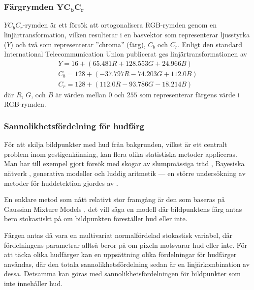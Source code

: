 \documentclass[../rapport_MVEX01-11-05]{subfiles}
\begin{document}
\subsubsection[Färgrymden $\mathrm{YC_bC_r}$]{Färgrymden $\mathbf{YC_bC_r}$}

$YC_bC_r$-rymden är ett försök att ortogonalisera RGB-rymden genom en
linjärtransformation, vilken resulterar i en basvektor som
representerar ljusstyrka ($Y$) och två som representerar ''chroma''
(färg), $C_b$ och $C_r$. Enligt den standard International
Telecommunication Union publicerat \cite{ITU-BT601} ges
linjärtransformationen av
\begin{equation*}
  \label{eq:farg:ycbcr}
  \begin{gathered}
  Y   = 16  + ( 65.481R + 128.553G + 24.966B)\\
  C_b = 128 + (-37.797R - 74.203G  + 112.0B )\\
  C_r = 128 + (112.0R   - 93.786G  - 18.214B)
  \end{gathered}
\end{equation*}
där $R$, $G$, och $B$ är värden mellan $0$ och $255$ som representerar
färgens värde i RGB-rymden.

\subsubsection{Sannolikhetsfördelning för hudfärg}\label{sec:klassificering:hud}

För att skilja bildpunkter med hud från bakgrunden, vilket är ett
centralt problem inom gestigenkänning, kan flera olika statistiska
metoder
appliceras. Man har till exempel gjort försök med skogar av
slumpmässiga träd
\cite{Khan10}, Bayesiska nätverk \cite{Sebe04}, generativa modeller
\cite{Kruppa02}
och luddig aritmetik \cite{Shang10} --- en större undersökning av metoder
för huddetektion gjordes av .

En enklare metod som nått relativt stor framgång är den som baseras på
Gaussian Mixture Models \cite{Elmezain08,Hassanpour08}, det vill säga
en modell där bildpunktens färg antas bero stokastiskt på om
bildpunkten föreställer hud eller inte.

Färgen antas då vara en multivariat normalfördelad
stokastisk variabel, där fördelningens parametrar alltså beror på om
pixeln motsvarar hud eller inte. För att täcka olika hudfärger kan en
uppsättning olika
fördelningar för hudfärger användas, där den totala
sannolikhetsfördelning sedan är en linjärkombination av dessa. Detsamma
kan göras med sannolikhetsfördelningen för bildpunkter som inte
innehåller hud.
\end{document}

